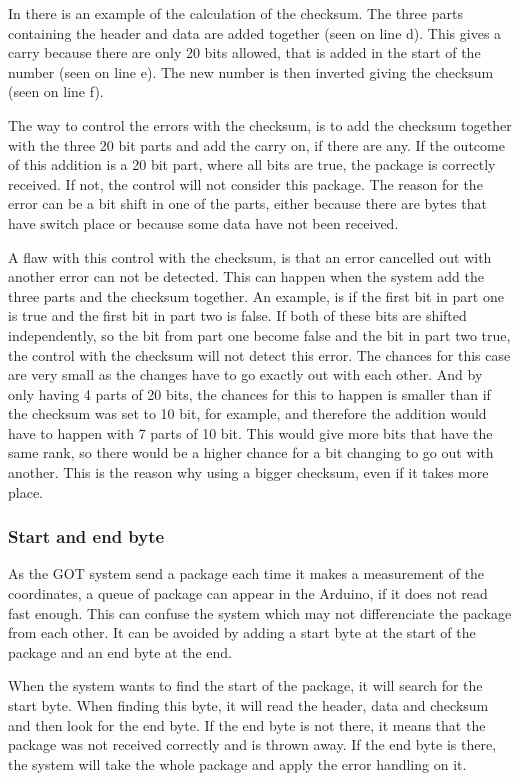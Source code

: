 In  there is an example of the calculation of the checksum. The three parts containing the header and data are added together (seen on line d). This gives a carry because there are only 20 bits allowed, that is added in the start of the number (seen on line e). The new number is then inverted giving the checksum (seen on line f).

The way to control the errors with the checksum, is to add the checksum together with the three 20 bit parts and add the carry on, if there are any. If the outcome of this addition is a 20 bit part, where all bits are true, the package is correctly received. If not, the control will not consider this package. The reason for the error can be a bit shift in one of the parts, either because there are bytes that have switch place or because some data have not been received. 

A flaw with this control with the checksum, is that an error cancelled out with another error can not be detected. This can happen when the system add the three parts and the checksum together. An example, is if the first bit in part one is true and the first bit in part two is false. If both of these bits are shifted independently, so the bit from part one become false and the bit in part two true, the control with the checksum will not detect this error. The chances for this case are very small as the changes have to go exactly out with each other. And by only having 4 parts of 20 bits, the chances for this to happen is smaller than if the checksum was set to 10 bit, for example, and therefore the addition would have to happen with 7 parts of 10 bit. This would give more bits that have the same rank, so there would be a higher chance for a bit changing to go out with another. This is the reason why using a bigger checksum, even if it takes more place.

\subsubsection{Start and end byte}

As the GOT system send a package each time it makes a measurement of the coordinates, a queue of package can appear in the Arduino, if it does not read fast enough. This can confuse the system which may not differenciate the package from each other. It can be avoided by adding a start byte at the start of the package and an end byte at the end. 

When the system wants to find the start of the package, it will search for the start byte. When finding this byte, it will read the header, data and checksum and then look for the end byte. If the end byte is not there, it means that the package was not received correctly and is thrown away. If the end byte is there, the system will take the whole package and apply the error handling on it. 

